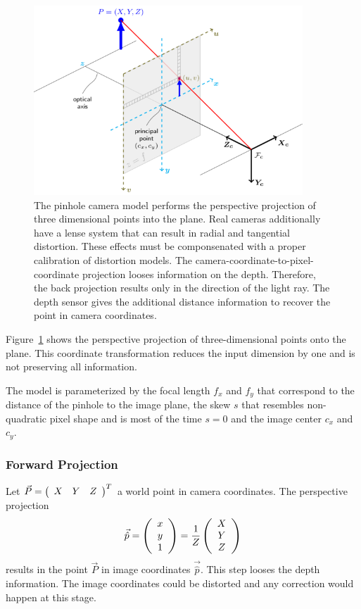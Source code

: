 \begin{figure}[H]
    \includegraphics[width=0.9\textwidth]{chapter03/img/pinhole_camera_model.png}
    \caption{The pinhole camera model performs the perspective projection of three dimensional points into the plane. Real cameras additionally have a lense system that can result in radial and tangential distortion. These effects must be componsenated with a proper calibration of distortion models. The camera-coordinate-to-pixel-coordinate projection looses information on the depth. Therefore, the back projection results only in the direction of the light ray. The depth sensor gives the additional distance information to recover the point in camera coordinates.}\label{fig:pinhole_model}
\end{figure}
Figure~\ref{fig:pinhole_model} shows the perspective projection of three-dimensional points onto the plane.
This coordinate transformation reduces the input dimension by one and is not preserving all information.

The model is parameterized by the focal length $f_x$ and $f_y$ that correspond to the distance of the pinhole to the image plane, the skew $s$ that resembles non-quadratic pixel shape and is most of the time $s = 0$ and the image center $c_x$ and $c_y$.

\subsubsection*{Forward Projection}

Let $\vec{P} = \left(\begin{array}{ccc} X & Y & Z \end{array}\right)^T$ a world point in camera coordinates.
The perspective projection
\begin{equation}
    \vec{\hat{p}} = \left(\begin{array}{c} x \\ y \\ 1 \end{array}\right) = \frac{1}{Z}\left(\begin{array}{c} X \\ Y \\ Z \end{array}\right)
    \label{eq:pinhole_forward}
\end{equation}
results in the point $\vec{P}$ in image coordinates $\vec{\hat{p}}$. This step looses the depth information.
The image coordinates could be distorted and any correction would happen at this stage.

